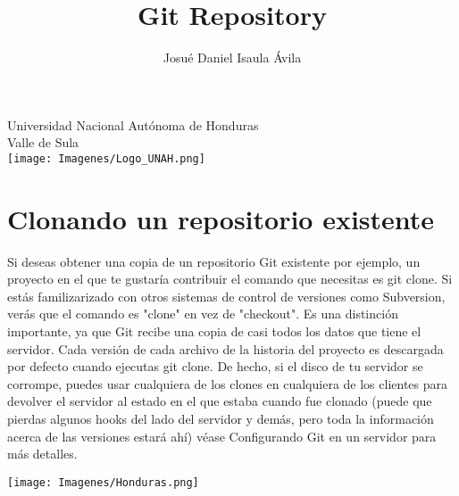 \documentclass[12pt,a4paper]{article}
\author{Josué Daniel Isaula Ávila}
\title{Git Repository}
\begin{document}
\maketitle 

\begin{center}
    \huge Universidad Nacional Autónoma de Honduras \\ 
    \large Valle de Sula \\
    \vspace{5 mm}
    \texttt{[image: Imagenes/Logo\_UNAH.png]}
\end{center}
\newpage


\section{Clonando un repositorio existente}
Si deseas obtener una copia de un repositorio Git existente por ejemplo, un
proyecto en el que te gustaría contribuir el comando que necesitas es git clone. Si
estás familizarizado con otros sistemas de control de versiones como Subversion, verás
que el comando es "clone" en vez de "checkout". Es una distinción importante, ya que
Git recibe una copia de casi todos los datos que tiene el servidor. Cada versión de
cada archivo de la historia del proyecto es descargada por defecto cuando ejecutas git
clone. De hecho, si el disco de tu servidor se corrompe, puedes usar cualquiera de los
clones en cualquiera de los clientes para devolver el servidor al estado en el que
estaba cuando fue clonado (puede que pierdas algunos hooks del lado del servidor y
demás, pero toda la información acerca de las versiones estará ahí) véase
Configurando Git en un servidor para más detalles. \vspace{0.5 cm}

\centering 
\texttt{[image: Imagenes/Honduras.png]}
\end{document}
